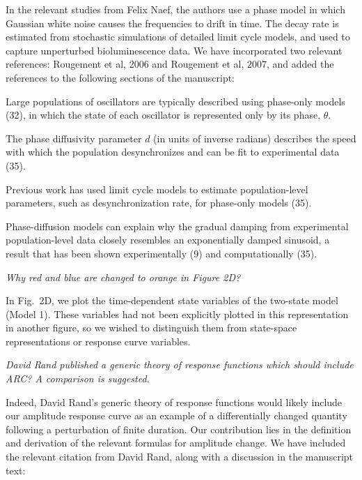 \documentclass[11pt, letterpaper]{article}
\newenvironment{reviewer}{\itshape\color{gray}}{}
\newenvironment{manuscript}[1]{\begin{center}\begin{tcolorbox}[colback=green!5!white,colframe=green!75!black,width=0.8\textwidth,title={#1},breakable,fonttitle=\bfseries]}{\end{tcolorbox}\end{center}}
\begin{document}
In the relevant studies from Felix Naef, the authors use a phase model in which Gaussian white noise causes the frequencies to drift in time.
The decay rate is estimated from stochastic simulations of detailed limit cycle models, and used to capture unperturbed bioluminescence data.
We have incorporated two relevant references: Rougement et al, 2006 and Rougement et al, 2007, and added the references to the following sections of the manuscript:

\begin{manuscript}{Page 5}
Large populations of oscillators are typically described using phase-only models (32), in which the state of each oscillator is represented only by its phase, $\theta$.
\end{manuscript}
\begin{manuscript}{Page 6}
The phase diffusivity parameter $d$ (in units of inverse radians) describes the speed with which the population desynchronizes and can be fit to experimental data (35).
\end{manuscript}
\begin{manuscript}{Page 11}
Previous work has used limit cycle models to estimate population-level parameters, such as desynchronization rate, for phase-only models (35).
\end{manuscript}
\begin{manuscript}{Page 12}
Phase-diffusion models can explain why the gradual damping from experimental population-level data closely resembles an exponentially damped sinusoid, a result that has been shown experimentally (9) and computationally (35).
\end{manuscript}

\begin{reviewer}
Why red and blue are changed to orange in Figure 2D? 
\end{reviewer}
 
In Fig.~2D, we plot the time-dependent state variables of the two-state model (Model 1).
These variables had not been explicitly plotted in this representation in another figure, so we wished to distinguish them from state-space representations or response curve variables.

\begin{reviewer}
David Rand published a generic theory of response functions which should include ARC?
A comparison is suggested. 
\end{reviewer}

Indeed, David Rand's generic theory of response functions would likely include our amplitude response curve as an example of a differentially changed quantity following a perturbation of finite duration.
Our contribution lies in the definition and derivation of the relevant formulas for amplitude change.
We have included the relevant citation from David Rand, along with a discussion in the manuscript text:
\end{document}
